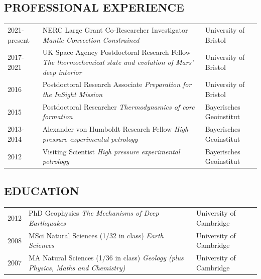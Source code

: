 \documentclass[11pt,twoside,a4paper]{article}
\begin{document}
\subsection*{PROFESSIONAL EXPERIENCE}
\vspace{-0.5em}
\begin{table}[!h]
\centering
\begin{tabular}{L{2cm} L{10.5cm} L{4.5cm}}
2021-present & NERC Large Grant Co-Researcher Investigator \newline \emph{Mantle Convection Constrained} & University of Bristol \vfill \\
2017-2021 & UK Space Agency Postdoctoral Research Fellow \newline \emph{The thermochemical state and evolution of Mars' deep interior} & University of Bristol \vfill \\
2016 \vfill & Postdoctoral Research Associate \newline \emph{Preparation for the InSight Mission} & University of Bristol \vfill \\
2015 \vfill & Postdoctoral Researcher \newline \emph{Thermodynamics of core formation} & Bayerisches Geoinstitut \vfill \\
2013-2014 \vfill & Alexander von Humboldt Research Fellow \newline \emph{High pressure experimental petrology} & Bayerisches Geoinstitut \vfill \\
2012 \vfill & Visiting Scientist \newline \emph{High pressure experimental petrology} & Bayerisches Geoinstitut \vfill
\end{tabular}
\end{table}
\vspace{-1.5em}

\subsection*{EDUCATION}
\vspace{-0.5em}
\begin{table}[!h]
\centering
\begin{tabular}{L{2cm} L{10.5cm} L{4.5cm}}
2012 \vfill & PhD Geophysics \newline \emph{The Mechanisms of Deep Earthquakes} & University of Cambridge\vfill \\
2008 \vfill & MSci Natural Sciences (1/32 in class) \newline \emph{Earth Sciences} & University of Cambridge \vfill\\
2007 \vfill & MA Natural Sciences (1/36 in class) \newline \emph{Geology (plus Physics, Maths and Chemistry)} & University of Cambridge \vfill
\end{tabular}
\end{table}
\vspace{-1.5em}
\end{document}
